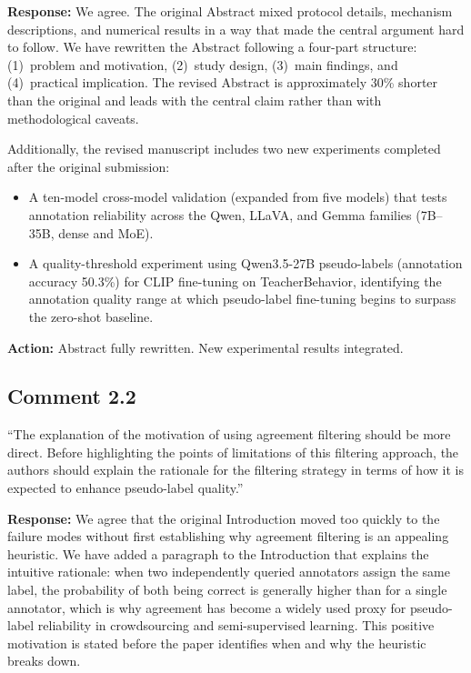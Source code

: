 \documentclass[11pt]{article}
\begin{document}
\textbf{Response:} We agree. The original Abstract mixed protocol details, mechanism descriptions, and numerical results in a way that made the central argument hard to follow. We have rewritten the Abstract following a four-part structure: (1)~problem and motivation, (2)~study design, (3)~main findings, and (4)~practical implication. The revised Abstract is approximately 30\% shorter than the original and leads with the central claim rather than with methodological caveats.

Additionally, the revised manuscript includes two new experiments completed after the original submission:
\begin{itemize}[nosep]
  \item[(a)] A ten-model cross-model validation (expanded from five models) that tests annotation reliability across the Qwen, LLaVA, and Gemma families (7B--35B, dense and MoE).
  \item[(b)] A quality-threshold experiment using Qwen3.5-27B pseudo-labels (annotation accuracy 50.3\%) for CLIP fine-tuning on TeacherBehavior, identifying the annotation quality range at which pseudo-label fine-tuning begins to surpass the zero-shot baseline.
\end{itemize}

\textbf{Action:} Abstract fully rewritten. New experimental results integrated.

\subsection*{Comment 2.2}

``The explanation of the motivation of using agreement filtering should be more direct. Before highlighting the points of limitations of this filtering approach, the authors should explain the rationale for the filtering strategy in terms of how it is expected to enhance pseudo-label quality.''

\textbf{Response:} We agree that the original Introduction moved too quickly to the failure modes without first establishing why agreement filtering is an appealing heuristic. We have added a paragraph to the Introduction that explains the intuitive rationale: when two independently queried annotators assign the same label, the probability of both being correct is generally higher than for a single annotator, which is why agreement has become a widely used proxy for pseudo-label reliability in crowdsourcing and semi-supervised learning. This positive motivation is stated before the paper identifies when and why the heuristic breaks down.
\end{document}
